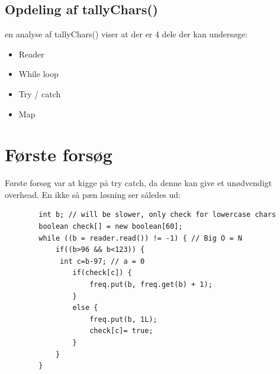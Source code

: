 \subsection*{Opdeling af tallyChars()}
en analyse af tallyChars() viser at der er 4 dele der kan undersøge:
\begin{itemize}
\item Reader
\item While loop
\item Try / catch
\item Map
\end{itemize}

\section*{Første forsøg}
Første forsøg var at kigge på try catch, da denne kan give et unødvendigt overhead.
En ikke så pæn løsning ser således ud:







\begin{lstlisting}
        int b; // will be slower, only check for lowercase chars
        boolean check[] = new boolean[60];
        while ((b = reader.read()) != -1) { // Big O = N
            if((b>96 && b<123)) {
             int c=b-97; // a = 0
                if(check[c]) {
                    freq.put(b, freq.get(b) + 1);
                }
                else {
                    freq.put(b, 1L);
                    check[c]= true;
                }
            }
        }
\end{lstlisting}


